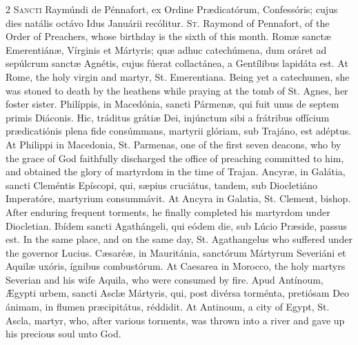 \begin{paracol}{2}
\lettrine[lines=2]{S}{ancti} Raymúndi de Pénnafort, ex Ordine Prædicatórum, 
 Confessóris; cujus dies natális octávo Idus Januárii recólitur.
\switchcolumn
{}
\lettrine[lines=2]{S}{t.} Raymond of Pennafort, of the Order of Preachers, whose birthday is the 
 sixth of this month.
\switchcolumn*
{}
Romæ sanctæ Emerentiánæ, Vírginis et Mártyris; 
 quæ adhuc catechúmena, dum oráret ad sepúlcrum sanctæ Agnétis, cujus fúerat 
 collactánea, a Gentílibus lapidáta est.
\switchcolumn
{}
At Rome, the holy virgin and martyr, St. Emerentiana. Being yet a 
 catechumen, she was stoned to death by the heathens while praying at the 
 tomb of St. Agnes, her foster sister.
\switchcolumn*
{}
Philíppis, in Macedónia, sancti Pármenæ, qui 
 fuit unus de septem primis Diáconis. Hic, tráditus grátiæ Dei, injúnctum sibi a frátribus offícium prædicatiónis plena fide consúmmans, 
 martyrii glóriam, sub Trajáno, est adéptus.
\switchcolumn
{}
At Philippi in Macedonia, St. Parmenas, one of the first seven deacons, who 
 by the grace of God faithfully discharged the office of preaching committed 
 to him, and obtained the glory of martyrdom in the time of Trajan.
\switchcolumn*
{}
Ancyræ, in Galátia, sancti Cleméntis Epíscopi, 
 qui, sæpius cruciátus, tandem, sub Diocletiáno Imperatóre, martyrium 
 consummávit.
\switchcolumn
{}
At Ancyra in Galatia, St. Clement, bishop. After enduring frequent 
 torments, he finally completed his martyrdom under Diocletian.
\switchcolumn*
{}
Ibídem sancti Agathángeli, qui eódem die, sub 
 Lúcio Præside, passus est.
\switchcolumn
{}
In the same place, and on the same day, St. Agathangelus who suffered under 
 the governor Lucius.
\switchcolumn*
{}
Cæsaréæ, in Mauritánia, sanctórum Mártyrum 
 Severiáni et Aquilæ uxóris, ígnibus combustórum.
\switchcolumn
{}
At Caesarea in Morocco, the holy martyrs Severian and his wife Aquila, who 
 were consumed by fire.
\switchcolumn*
{}
Apud Antínoum, Ægypti urbem, sancti Asclæ 
 Mártyris, qui, post divérsa torménta, pretiósam Deo ánimam, in flumen 
 præcipitátus, réddidit.
\switchcolumn
{}
At Antinoum, a city of Egypt, St. Ascla, martyr, who, after various 
 torments, was thrown into a river and gave up his precious soul unto God.
\switchcolumn*
{}

\end{paracol}
